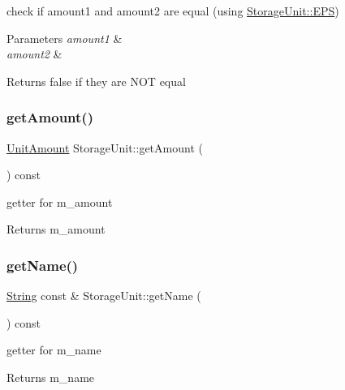 check if amount1 and amount2 are equal (using \hyperlink{classStorageUnit_af43ba3a77fda788aae3a6b2065d590a3}{Storage\+Unit\+::\+E\+PS}) 
\begin{DoxyParams}{Parameters}
{\em amount1} & \\
\hline
{\em amount2} & \\
\hline
\end{DoxyParams}
\begin{DoxyReturn}{Returns}
false if they are N\+OT equal 
\end{DoxyReturn}
\mbox{\label{classStorageUnit_ae089fb2cb93956bfe209c0801a685252}} 
\subsubsection{\texorpdfstring{get\+Amount()}{getAmount()}}
{\footnotesize\ttfamily \hyperlink{StorageUnit_8hpp_a13b2ba6b0400e1aa0b57282bd1228f20}{Unit\+Amount} Storage\+Unit\+::get\+Amount (\begin{DoxyParamCaption}{ }\end{DoxyParamCaption}) const}

getter for m\+\_\+amount \begin{DoxyReturn}{Returns}
m\+\_\+amount 
\end{DoxyReturn}
\mbox{\label{classStorageUnit_acdc901c1def8c1937524d20d645e8738}} 
\subsubsection{\texorpdfstring{get\+Name()}{getName()}}
{\footnotesize\ttfamily \hyperlink{classString}{String} const  \& Storage\+Unit\+::get\+Name (\begin{DoxyParamCaption}{ }\end{DoxyParamCaption}) const}

getter for m\+\_\+name \begin{DoxyReturn}{Returns}
m\+\_\+name 
\end{DoxyReturn}
\mbox{\label{classStorageUnit_a36c88992cc1346c082b9905a018ddace}} 
